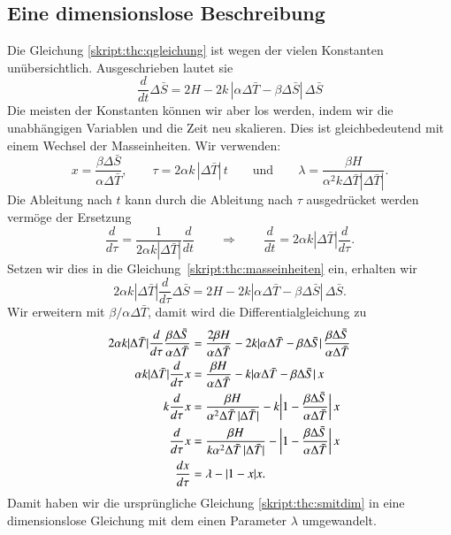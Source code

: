 \subsection{Eine dimensionslose Beschreibung}
Die Gleichung \eqref{skript:thc:qgleichung} ist wegen der vielen
Konstanten unübersichtlich.
Ausgeschrieben lautet sie
\begin{equation}
\frac{d}{dt}\Delta\bar S
=
2H
-2k\,|\alpha\Delta\bar T- \beta \Delta\bar S|\,\Delta\bar S
\label{skript:thc:smitdim}
\end{equation}
Die meisten der Konstanten können wir aber los werden, indem wir 
die unabhängigen Variablen und die Zeit neu skalieren.
Dies ist gleichbedeutend mit einem Wechsel der Masseinheiten.
Wir verwenden:
\begin{equation}
x=\frac{\beta\Delta\bar S}{\alpha\Delta\bar T},
\qquad
\tau = 2\alpha k\,|\Delta\bar T|\, t
\qquad\text{und}\qquad
\lambda = \frac{\beta H}{\alpha^2 k\Delta\bar T|\Delta\bar T|}.
\label{skript:thc:masseinheiten}
\end{equation}
Die Ableitung nach $t$ kann durch die Ableitung nach $\tau$ ausgedrücket
werden vermöge der Ersetzung
\[
\frac{d}{d\tau}
=
\frac{1}{2\alpha k|\Delta\bar T|}
\frac{d}{dt}
\qquad\Rightarrow\qquad
\frac{d}{dt}
=
2\alpha k|\Delta\bar T|\frac{d}{d\tau}.
\]
Setzen wir dies in die Gleichung~\eqref{skript:thc:masseinheiten}
ein, erhalten wir
\begin{equation}
2\alpha k|\Delta\bar T|
\frac{d}{d\tau} \Delta\bar S
=
2H-2k|\alpha\Delta\bar T-\beta\Delta\bar S|\,\Delta\bar S.
\end{equation}
Wir erweitern mit $\beta/\alpha\Delta\bar T$, damit wird die
Differentialgleichung zu
\begin{align}
2\alpha k|\Delta\bar T|
\frac{d}{d\tau}\frac{\beta\Delta\bar S}{\alpha\Delta\bar T}
&=
\frac{2\beta H}{\alpha\Delta\bar T} - 2k|\alpha\Delta\bar T-\beta\Delta\bar S|\,
\frac{\beta\Delta\bar S}{\alpha\Delta\bar T}
\notag
\\
\alpha k|\Delta\bar T|
\frac{d}{d\tau}x
&=
\frac{\beta H}{\alpha\Delta\bar T}
-k|\alpha\Delta\bar T-\beta\Delta\bar S|\, x
\notag
\\
k
\frac{d}{d\tau}x
&=
\frac{\beta H}{\alpha^2\Delta\bar T\,|\Delta\bar T|}
-k\biggl|1-\frac{\beta\Delta\bar S}{\alpha\Delta\bar T}\biggr|\,x
\notag
\\
\frac{d}{d\tau}x
&=
\frac{\beta H}{k\alpha^2\Delta\bar T\,|\Delta\bar T|}
-\biggl|1-\frac{\beta\Delta\bar S}{\alpha\Delta\bar T}\biggr|\,x
\notag
\\
\frac{dx}{d\tau}
&=
\lambda - |1-x|x.
\label{skript:thc:dimensionslos}
\end{align}
Damit haben wir die ursprüngliche Gleichung
\eqref{skript:thc:smitdim}
in eine dimensionslose Gleichung mit dem einen Parameter $\lambda$
umgewandelt.

